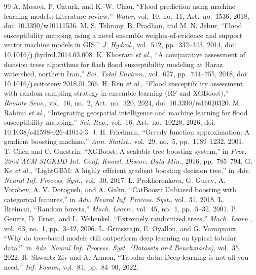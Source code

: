 \documentclass[conference]{IEEEtran}
\begin{document}
\begin{thebibliography}{99}
 A. Mosavi, P. Ozturk, and K.-W. Chau, ``Flood prediction using machine learning models: Literature review,'' \emph{Water}, vol.~10, no.~11, Art.~no.~1536, 2018, doi: 10.3390/w10111536.
 M. S. Tehrany, B. Pradhan, and M. N. Jebur, ``Flood susceptibility mapping using a novel ensemble weights-of-evidence and support vector machine models in GIS,'' \emph{J. Hydrol.}, vol.~512, pp.~332--343, 2014, doi: 10.1016/j.jhydrol.2014.03.008.
 K. Khosravi \emph{et al.}, ``A comparative assessment of decision trees algorithms for flash flood susceptibility modeling at Haraz watershed, northern Iran,'' \emph{Sci. Total Environ.}, vol.~627, pp.~744--755, 2018, doi: 10.1016/j.scitotenv.2018.01.266.
 H. Ren \emph{et al.}, ``Flood susceptibility assessment with random sampling strategy in ensemble learning (RF and XGBoost),'' \emph{Remote Sens.}, vol.~16, no.~2, Art.~no.~320, 2024, doi: 10.3390/rs16020320.
 M. Rahimi \emph{et al.}, ``Integrating geospatial intelligence and machine learning for flood susceptibility mapping,'' \emph{Sci. Rep.}, vol.~16, Art.~no.~10228, 2026, doi: 10.1038/s41598-026-41014-3.
 J. H. Friedman, ``Greedy function approximation: A gradient boosting machine,'' \emph{Ann. Statist.}, vol.~29, no.~5, pp.~1189--1232, 2001.
 T. Chen and C. Guestrin, ``XGBoost: A scalable tree boosting system,'' in \emph{Proc. 22nd ACM SIGKDD Int. Conf. Knowl. Discov. Data Min.}, 2016, pp.~785--794.
 G. Ke \emph{et al.}, ``LightGBM: A highly efficient gradient boosting decision tree,'' in \emph{Adv. Neural Inf. Process. Syst.}, vol.~30, 2017.
 L. Prokhorenkova, G. Gusev, A. Vorobev, A. V. Dorogush, and A. Gulin, ``CatBoost: Unbiased boosting with categorical features,'' in \emph{Adv. Neural Inf. Process. Syst.}, vol.~31, 2018.
 L. Breiman, ``Random forests,'' \emph{Mach. Learn.}, vol.~45, no.~1, pp.~5--32, 2001.
 P. Geurts, D. Ernst, and L. Wehenkel, ``Extremely randomized trees,'' \emph{Mach. Learn.}, vol.~63, no.~1, pp.~3--42, 2006.
 L. Grinsztajn, E. Oyallon, and G. Varoquaux, ``Why do tree-based models still outperform deep learning on typical tabular data?'' in \emph{Adv. Neural Inf. Process. Syst. (Datasets and Benchmarks)}, vol.~35, 2022.
 R. Shwartz-Ziv and A. Armon, ``Tabular data: Deep learning is not all you need,'' \emph{Inf. Fusion}, vol.~81, pp.~84--90, 2022.

\end{thebibliography}
\end{document}
